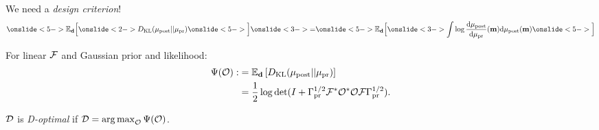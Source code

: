 \documentclass{beamer}
\begin{document}
\begin{frame}
  We need a \emph{design criterion}!  
  \begin{equation*}
    \onslide<5->{\mathbb{E}_{\data} \Big [}\onslide<2->{D_{\text{KL}} (\post || \pr )} \onslide<5->{\Big ]}
    \onslide<3->{=} \onslide<5->{\mathbb{E}_{\data} \Big [}\onslide<3->{\int \log \frac{\der \post}{\der \pr}(\param) \der \post(\param)}  \onslide<5->{\Big ]}
  \end{equation*}
\end{frame}


\begin{frame}
  \begin{theorem}\label{thm:d_optimality}
    For linear $\mathcal{F}$ and Gaussian prior and likelihood:
    \begin{align*}
      \begin{split}
        \Psi( \mathcal{O}) :&= \mathbb{E}_{\mathbf{d}}\left [ D_{\text{KL}} (\mu_{\textup{post}} || \mu_{\textup{pr}} ) \right ] \\
        &= \frac12 \log \det 
        ( I +  \Gamma_{\textup{pr}}^{1/2}  \mathcal{F} ^* \mathcal{O}^* \mathcal{O} \mathcal{F} \Gamma_{\textup{pr}}^{1/2}).
      \end{split}
    \end{align*}
  \end{theorem}

  \pause
  \begin{definition}
    \(\mathcal{D}\) is \emph{D-optimal} if \(\mathcal{D} = \operatorname*{arg\,max}_{\mathcal{O}}
    \Psi(\mathcal{O})\).
  \end{definition}


\end{frame}
\end{document}
